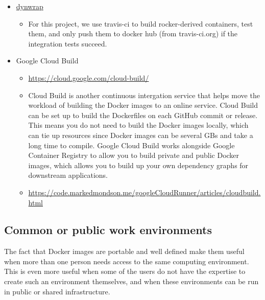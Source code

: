 \begin{itemize}
\tightlist
\item
  \href{https://github.com/dynverse/dynwrap_containers/blob/master/.travis.yml}{dynwrap}
  \citep{rcannood}

  \begin{itemize}
  \tightlist
  \item
    For this project, we use travis-ci to build rocker-derived
    containers, test them, and only push them to docker hub (from
    travis-ci.org) if the integration tests succeed.
  \end{itemize}
\item
  Google Cloud Build

  \begin{itemize}
  \tightlist
  \item
    \url{https://cloud.google.com/cloud-build/}
  \item
    Cloud Build is another continuous intergation service that helps
    move the workload of building the Docker images to an online
    service. Cloud Build can be set up to build the Dockerfiles on each
    GitHub commit or release. This means you do not need to build the
    Docker images locally, which can tie up resources since Docker
    images can be several GBs and take a long time to compile. Google
    Cloud Build works alongside Google Container Registry to allow you
    to build private and public Docker images, which allows you to build
    up your own dependency graphs for downstream applications.
  \item
    \url{https://code.markedmondson.me/googleCloudRunner/articles/cloudbuild.html}
  \end{itemize}
\end{itemize}

\hypertarget{common-or-public-work-environments}{%
\subsection{Common or public work
environments}\label{common-or-public-work-environments}}

\label{workenvs}

The fact that Docker images are portable and well defined make them
useful when more than one person needs access to the same computing
environment. This is even more useful when some of the users do not have
the expertise to create such an environment themselves, and when these
environments can be run in public or shared infrastructure.

